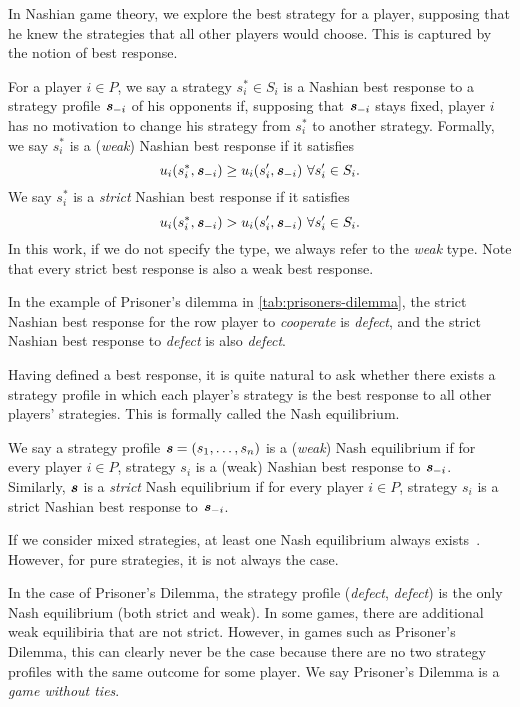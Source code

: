 In Nashian game theory, we explore the best strategy for a player, supposing that he knew the strategies that all other players would choose.
This is captured by the notion of best response.

\begin{definition}
  For a player $i \in P$, we say a strategy $s_i^* \in S_i$ is a Nashian best response to a strategy profile $\boldsymbol{\mathit{s}}_{-i}$ of his opponents if, supposing that $\boldsymbol{\mathit{s}}_{-i}$ stays fixed, player $i$ has no motivation to change his strategy from $s_i^*$ to another strategy.
  Formally, we say $s_i^*$ is a (\textit{weak}) Nashian best response if it satisfies
  \[
    u_i(s_i^*, \vecs_{-i}) \ge u_i(s_i', \vecs_{-i})\ \forall s_i' \in S_i.
  \]
  We say $s_i^*$ is a \textit{strict} Nashian best response if it satisfies
  \[
    u_i(s_i^*, \boldsymbol{\mathit{s}}_{-i}) > u_i(s_i', \boldsymbol{\mathit{s}}_{-i})\ \forall s_i' \in S_i.
  \]
  In this work, if we do not specify the type, we always refer to the \textit{weak} type.
  Note that every strict best response is also a weak best response.
\end{definition}

In the example of Prisoner's dilemma in \autoref{tab:prisoners-dilemma}, the strict Nashian best response for the row player to \textit{cooperate} is \textit{defect}, and the strict Nashian best response to \textit{defect} is also \textit{defect}.

Having defined a best response, it is quite natural to ask whether there exists a strategy profile in which each player's strategy is the best response to all other players' strategies.
This is formally called the Nash equilibrium.

\begin{definition}
  We say a strategy profile $\boldsymbol{\mathit{s}} = (s_1, \dots, s_n)$ is a (\textit{weak}) Nash equilibrium if for every player $i \in P$, strategy $s_i$ is a (weak) Nashian best response to $\boldsymbol{\mathit{s}}_{-i}$.
  Similarly, $\boldsymbol{\mathit{s}}$ is a \textit{strict} Nash equilibrium if for every player $i \in P$, strategy $s_i$ is a strict Nashian best response to $\boldsymbol{\mathit{s}}_{-i}$.
\end{definition}

If we consider mixed strategies, at least one Nash equilibrium always exists~\cite{Nash51}.
However, for pure strategies, it is not always the case.

In the case of Prisoner's Dilemma, the strategy profile (\textit{defect}, \textit{defect}) is the only Nash equilibrium (both strict and weak).
In some games, there are additional weak equilibiria that are not strict.
However, in games such as Prisoner's Dilemma, this can clearly never be the case because there are no two strategy profiles with the same outcome for some player.
We say Prisoner's Dilemma is a \textit{game without ties}.

